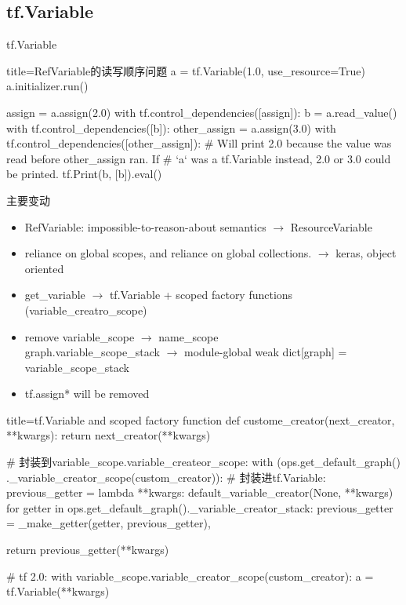 
\subsection{tf.Variable}

\begin{frame}[fragile]{tf.Variable}
    \begin{tcblisting}{title=RefVariable的读写顺序问题}
        a = tf.Variable(1.0, use_resource=True)
        a.initializer.run()

        assign = a.assign(2.0)
        with tf.control_dependencies([assign]):
          b = a.read_value()
        with tf.control_dependencies([b]):
          other_assign = a.assign(3.0)
        with tf.control_dependencies([other_assign]):
          # Will print 2.0 because the value was read before other_assign ran. If
          # `a` was a tf.Variable instead, 2.0 or 3.0 could be printed.
          tf.Print(b, [b]).eval()
    \end{tcblisting}
\end{frame}

\begin{frame}{主要变动}
    \begin{itemize}
        \item RefVariable: impossible-to-reason-about semantics $\to$ ResourceVariable
        \item reliance on global scopes, and reliance on global collections. $\to$ keras, object oriented
        \item get\_variable  $\to$ tf.Variable + scoped factory functions (variable\_creatro\_scope)
        \item remove variable\_scope $\to$ name\_scope \\
            graph.variable\_scope\_stack $\to$ module-global weak dict[graph] = variable\_scope\_stack
        \item tf.assign* will be removed
    \end{itemize}
\end{frame}

\begin{frame}[fragile]
    \begin{tcblisting}{title=tf.Variable and scoped factory function}
        def custome_creator(next_creator, **kwargs):
          return next_creator(**kwargs)

        # 封装到variable_scope.variable_createor_scope:
        with (ops.get_default_graph()
                 ._variable_creator_scope(custom_creator)):
          # 封装进tf.Variable:
          previous_getter = lambda **kwargs: default_variable_creator(None, **kwargs)
          for getter in ops.get_default_graph()._variable_creator_stack:
            previous_getter = _make_getter(getter, previous_getter),

          return previous_getter(**kwargs)

        # tf 2.0:
        with variable_scope.variable_creator_scope(custom_creator):
          a = tf.Variable(**kwargs)
    \end{tcblisting}
\end{frame}

